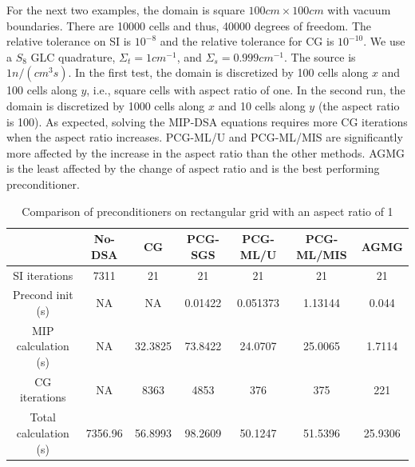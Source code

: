 For the next two examples, the domain is square $100cm
\times 100cm$ with vacuum boundaries. There are 10000 cells and thus, 40000
degrees of freedom. The relative tolerance on SI is $10^{-8}$ and the relative
tolerance for CG is $10^{-10}$. We use a $S_8$ GLC quadrature, $\Sigma_t =
1cm^{-1}$, and $\Sigma_s = 0.999cm^{-1}$. The source is $1n/(cm^3s)$. In the
first test, the domain is discretized by 100 cells along $x$ and 100 cells
along $y$, i.e., square cells with aspect ratio of one. In the second run, 
the domain is discretized by 1000 cells along $x$ and 10 cells along $y$ 
(the aspect ratio is 100).
%
As expected, solving the MIP-DSA equations requires more CG iterations when the aspect
ratio increases. PCG-ML/U and PCG-ML/MIS are significantly more affected by the
increase in the aspect ratio than the other methods. AGMG is the least
affected by the change of aspect ratio and is the best performing
preconditioner.
%
\begin{table}[!htbp]
  \caption{Comparison of preconditioners on rectangular grid with an aspect
  ratio of 1}
  \begin{center}
    \begin{tabular}{|c|c|c|c|c|c|c|}
      \hline
       & No-DSA & CG & PCG-SGS & PCG-ML/U & PCG-ML/MIS & AGMG \\
      \hline
      SI iterations & 7311      & 21      & 21      & 21       & 21      & 21 \\
   Precond init (s) & NA        & NA      & 0.01422 & 0.051373 & 1.13144 &
      0.044 \\
MIP calculation (s) & NA        & 32.3825 & 73.8422 & 24.0707  & 25.0065 &
      1.7114 \\
      CG iterations & NA        & 8363    & 4853    & 376      & 375     &
      221\\
Total calculation (s) & 7356.96 & 56.8993 & 98.2609 & 50.1247  & 51.5396 &
      25.9306 \\
      \hline
    \end{tabular}
    \label{table_ar_1}
  \end{center}
\end{table}
%
